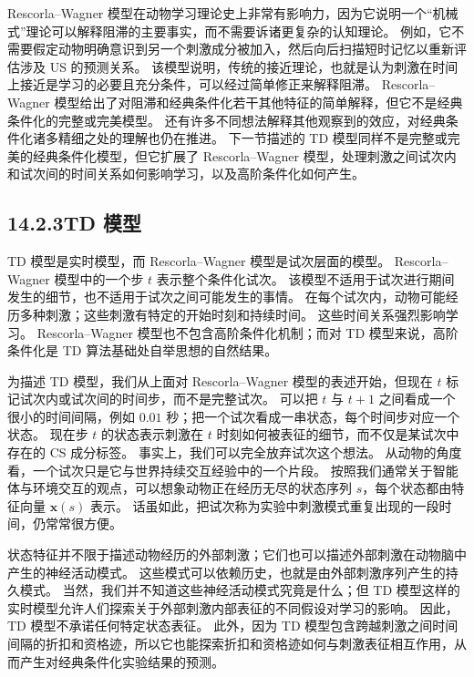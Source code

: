 \documentclass[UTF8, 12pt, fontset=fandol, oneside]{ctexart}
\begin{document}
Rescorla--Wagner 模型在动物学习理论史上非常有影响力，因为它说明一个“机械式”理论可以解释阻滞的主要事实，而不需要诉诸更复杂的认知理论。
例如，它不需要假定动物明确意识到另一个刺激成分被加入，然后向后扫描短时记忆以重新评估涉及 US 的预测关系。
该模型说明，传统的接近理论，也就是认为刺激在时间上接近是学习的必要且充分条件，可以经过简单修正来解释阻滞。
Rescorla--Wagner 模型给出了对阻滞和经典条件化若干其他特征的简单解释，但它不是经典条件化的完整或完美模型。
还有许多不同想法解释其他观察到的效应，对经典条件化诸多精细之处的理解也仍在推进。
下一节描述的 TD 模型同样不是完整或完美的经典条件化模型，但它扩展了 Rescorla--Wagner 模型，处理刺激之间试次内和试次间的时间关系如何影响学习，以及高阶条件化如何产生。

\subsection*{14.2.3\quad TD 模型}

TD 模型是实时模型，而 Rescorla--Wagner 模型是试次层面的模型。
Rescorla--Wagner 模型中的一个步 $t$ 表示整个条件化试次。
该模型不适用于试次进行期间发生的细节，也不适用于试次之间可能发生的事情。
在每个试次内，动物可能经历多种刺激；这些刺激有特定的开始时刻和持续时间。
这些时间关系强烈影响学习。
Rescorla--Wagner 模型也不包含高阶条件化机制；而对 TD 模型来说，高阶条件化是 TD 算法基础处自举思想的自然结果。

为描述 TD 模型，我们从上面对 Rescorla--Wagner 模型的表述开始，但现在 $t$ 标记试次内或试次间的时间步，而不是完整试次。
可以把 $t$ 与 $t+1$ 之间看成一个很小的时间间隔，例如 $0.01$ 秒；把一个试次看成一串状态，每个时间步对应一个状态。
现在步 $t$ 的状态表示刺激在 $t$ 时刻如何被表征的细节，而不仅是某试次中存在的 CS 成分标签。
事实上，我们可以完全放弃试次这个想法。
从动物的角度看，一个试次只是它与世界持续交互经验中的一个片段。
按照我们通常关于智能体与环境交互的观点，可以想象动物正在经历无尽的状态序列 $s$，每个状态都由特征向量 $\mathbf{x}(s)$ 表示。
话虽如此，把试次称为实验中刺激模式重复出现的一段时间，仍常常很方便。

状态特征并不限于描述动物经历的外部刺激；它们也可以描述外部刺激在动物脑中产生的神经活动模式。
这些模式可以依赖历史，也就是由外部刺激序列产生的持久模式。
当然，我们并不知道这些神经活动模式究竟是什么；但 TD 模型这样的实时模型允许人们探索关于外部刺激内部表征的不同假设对学习的影响。
因此，TD 模型不承诺任何特定状态表征。
此外，因为 TD 模型包含跨越刺激之间时间间隔的折扣和资格迹，所以它也能探索折扣和资格迹如何与刺激表征相互作用，从而产生对经典条件化实验结果的预测。
\end{document}
